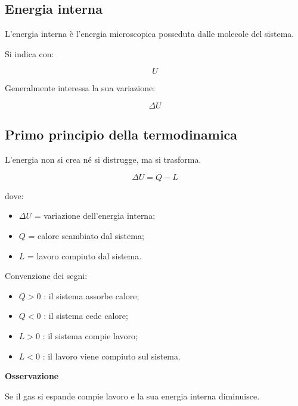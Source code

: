 \vspace{0.3cm}

\subsection{Energia interna}

\noindent L'energia interna è l'energia microscopica posseduta dalle molecole del sistema.

\noindent Si indica con:

\[
U
\]

\noindent Generalmente interessa la sua variazione:

\[
\Delta U
\]

\vspace{0.3cm}

\subsection{Primo principio della termodinamica}

\noindent L'energia non si crea né si distrugge, ma si trasforma.

\[
\Delta U=Q-L
\]

\noindent dove:

\begin{itemize}
    \item $\Delta U$ = variazione dell'energia interna;
    \item $Q$ = calore scambiato dal sistema;
    \item $L$ = lavoro compiuto dal sistema.
\end{itemize}

\vspace{0.3cm}

\noindent Convenzione dei segni:

\begin{itemize}
    \item $Q>0$ : il sistema assorbe calore;
    \item $Q<0$ : il sistema cede calore;
    \item $L>0$ : il sistema compie lavoro;
    \item $L<0$ : il lavoro viene compiuto sul sistema.
\end{itemize}

\vspace{0.3cm}

\noindent\textbf{Osservazione}

\noindent Se il gas si espande compie lavoro e la sua energia interna diminuisce.

